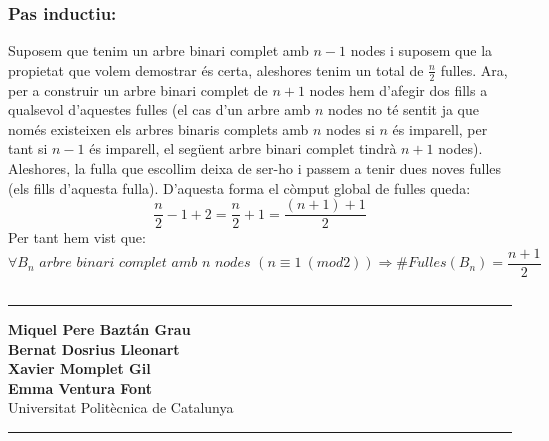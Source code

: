 \documentclass[a4paper,12pt]{article}
\begin{document}
\subsubsection*{Pas inductiu:}
Suposem que tenim un arbre binari complet amb $n-1$ nodes i suposem que la propietat que volem demostrar és certa, aleshores tenim un total de $\frac{n}{2}$ fulles. Ara, per a construir un arbre binari complet de $n + 1$ nodes hem d'afegir dos fills a qualsevol d'aquestes fulles (el cas d'un arbre amb $n$ nodes no té sentit ja que només existeixen els arbres binaris complets amb $n$ nodes si $n$ és imparell, per tant si $n-1$ és imparell, el següent arbre binari complet tindrà $n+1$ nodes). Aleshores, la fulla que escollim deixa de ser-ho i passem a tenir dues noves fulles (els fills d'aquesta fulla). D'aquesta forma el còmput global de fulles queda:
$$\frac{n}{2} - 1 + 2 = \frac{n}{2} + 1 = \frac{(n+1)+1}{2}$$
Per tant hem vist que:
$$\forall B_n \textit{ arbre binari complet amb n nodes $\left(n \equiv 1 \ (mod 2)\right)$} \Longrightarrow \# Fulles(B_n) = \frac{n+1}{2}$$


\newpage

$$$$

\vfill

\begin{center}
    \rule{0.8\textwidth}{0.5pt} %

    \vspace{.5cm}
    

    \textbf{Miquel Pere Baztán Grau\\ Bernat Dosrius Lleonart
    \\ Xavier Momplet Gil
    \\ Emma Ventura Font} \\%
    \vspace{0.2cm}
    Universitat Politècnica de Catalunya \\ %
    \vspace{0.5cm}
    \rule{0.4\textwidth}{0.4pt} %
\end{center}

\vfill
\end{document}
